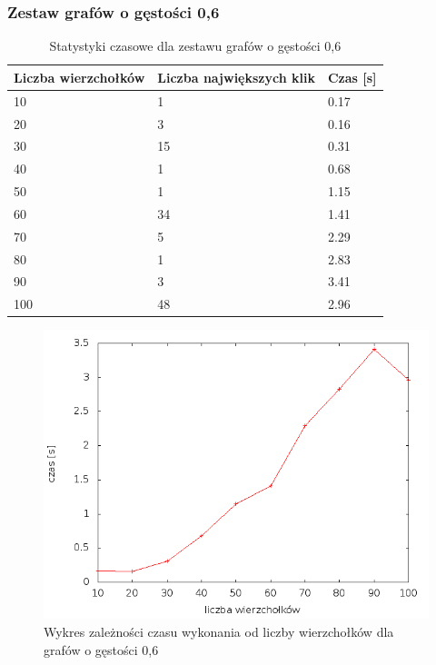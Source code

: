 \documentclass[12pt, a4paper]{article}
\begin{document}
\subsubsection*{Zestaw grafów o gęstości 0,6}
\begin{table}[H]
\caption{Statystyki czasowe dla zestawu grafów o gęstości 0,6}
\begin{center}
    \begin{tabular}{|l|l|l|}
    \hline
    Liczba wierzchołków & Liczba największych klik & Czas [s] \\ \hline
    10 & 1 & 0.17 \\ \hline
    20 & 3 & 0.16 \\ \hline
    30 & 15 & 0.31 \\ \hline
    40 & 1 & 0.68 \\ \hline
    50 & 1 & 1.15 \\ \hline
    60 & 34 & 1.41 \\ \hline
    70 & 5 & 2.29 \\ \hline
    80 & 1 & 2.83 \\ \hline
    90 & 3 & 3.41 \\ \hline
    100 & 48 & 2.96 \\ \hline
    \end{tabular}
\end{center}
\end{table}

\begin{figure}[h]
    \begin{center}
	\includegraphics[scale=0.5]{results/img/den/den_06.png}
	\caption{Wykres zależności czasu wykonania od liczby wierzchołków dla grafów o gęstości 0,6}
    \end{center}
\end{figure}
\end{document}
